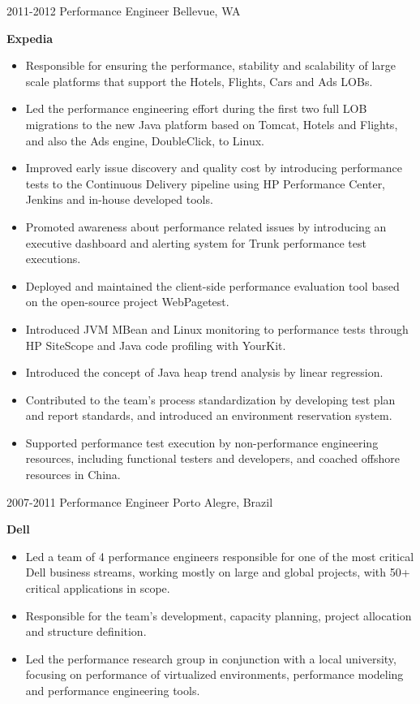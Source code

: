 \begin{entrylist}
    {2011-2012}
    {Performance Engineer}
    {Bellevue, WA}
    {
      \textbf{Expedia}
      \begin{itemize}
        \item Responsible for ensuring the performance, stability and scalability of large scale platforms that support the Hotels, Flights, Cars and Ads LOBs.
        \item Led the performance engineering effort during the first two full LOB migrations to the new Java platform based on Tomcat, Hotels and Flights, and also the Ads engine, DoubleClick, to Linux.
        \item Improved early issue discovery and quality cost by introducing performance tests to the Continuous Delivery pipeline using HP Performance Center, Jenkins and in-house developed tools.
        \item Promoted awareness about performance related issues by introducing an executive dashboard and alerting system for Trunk performance test executions.
        \item Deployed and maintained the client-side performance evaluation tool based on the open-source project WebPagetest.
        \item Introduced JVM MBean and Linux monitoring to performance tests through HP SiteScope and Java code profiling with YourKit.
        \item Introduced the concept of Java heap trend analysis by linear regression.
        \item Contributed to the team’s process standardization by developing test plan and report standards, and introduced an environment reservation system.
        \item Supported performance test execution by non-performance engineering resources, including functional testers and developers, and coached offshore resources in China.
      \end{itemize}
    }
  \entry
    {2007-2011}
    {Performance Engineer}
    {Porto Alegre, Brazil}
    {
      \textbf{Dell}
      \begin{itemize}
        \item Led a team of 4 performance engineers responsible for one of the most critical Dell business streams, working mostly on large and global projects, with 50+ critical applications in scope.
        \item Responsible for the team’s development, capacity planning, project allocation and structure definition.
        \item Led the performance research group in conjunction with a local university, focusing on performance of virtualized environments, performance modeling and performance engineering tools.

\end{itemize}}
\end{entrylist}
